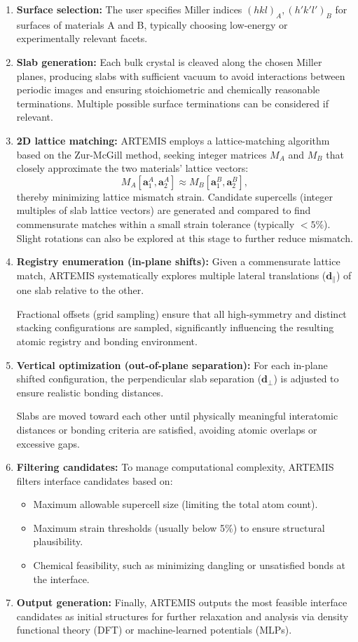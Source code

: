 \begin{enumerate}
    \item \textbf{Surface selection:} The user specifies Miller indices \((hkl)_A, (h'k'l')_B\) for surfaces of
    materials A and B, typically choosing low-energy or experimentally relevant facets.
    \item \textbf{Slab generation:} Each bulk crystal is cleaved along the chosen Miller planes, producing slabs with
    sufficient vacuum to avoid interactions between periodic images and ensuring stoichiometric and chemically
    reasonable terminations. Multiple possible surface terminations can be considered if relevant.
    \item \textbf{2D lattice matching:} ARTEMIS employs a lattice-matching algorithm based on the Zur-McGill method,
    seeking integer matrices \(M_A\) and \(M_B\) that closely approximate the two materials' lattice vectors:
    \[
    M_A [\mathbf{a}_1^A, \mathbf{a}_2^A] \approx M_B [\mathbf{a}_1^B, \mathbf{a}_2^B],
    \]
    thereby minimizing lattice mismatch strain\cite{artemis_paper}. Candidate supercells (integer multiples of slab
    lattice vectors) are generated and compared to find commensurate matches within a small strain tolerance (typically
    \(<5\%\)). Slight rotations can also be explored at this stage to further reduce mismatch.
    \item \textbf{Registry enumeration (in-plane shifts):} Given a commensurate lattice match, ARTEMIS systematically
    explores multiple lateral translations (\(\mathbf{d}_{\parallel}\)) of one slab relative to the other.

    Fractional offsets (grid sampling) ensure that all high-symmetry and distinct stacking configurations are sampled,
    significantly influencing the resulting atomic registry and bonding environment.
    \item \textbf{Vertical optimization (out-of-plane separation):} For each in-plane shifted configuration, the
    perpendicular slab separation (\(\mathbf{d}_{\perp}\)) is adjusted to ensure realistic bonding distances.

    Slabs are moved toward each other until physically meaningful interatomic distances or bonding criteria are
    satisfied, avoiding atomic overlaps or excessive gaps.
    \item \textbf{Filtering candidates:} To manage computational complexity, ARTEMIS filters interface candidates based
    on:
        \begin{itemize}
            \item Maximum allowable supercell size (limiting the total atom count).
            \item Maximum strain thresholds (usually below 5\%) to ensure structural plausibility.
            \item Chemical feasibility, such as minimizing dangling or unsatisfied bonds at the interface.
        \end{itemize}
    \item \textbf{Output generation:} Finally, ARTEMIS outputs the most feasible interface candidates as initial
    structures for further relaxation and analysis via density functional theory (DFT) or machine-learned potentials
    (MLPs).


\end{enumerate}
